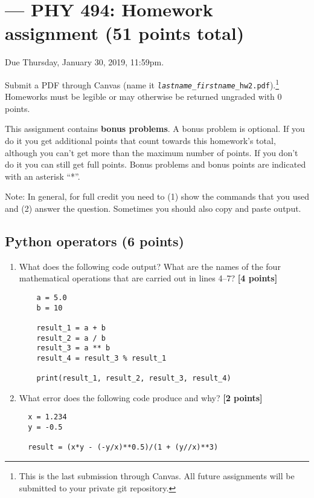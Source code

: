 \documentclass[letterpaper]{scrartcl}
\newcommand{\anumber}{2}
\newcounter{TotalPoints}
\newcommand{\points}[1]{\textbf{[#1 points]}\stepcounter{TotalPoints}}
\newenvironment{enuma}{\begin{enumerate}[label=(\alph*)]}{\end{enumerate}}
\begin{document}

\setcounter{section}{\anumber}
\addtocounter{section}{-1}
\section{ --- PHY 494: Homework assignment (51 points total)}

\noindent Due Thursday, January 30, 2019, 11:59pm.

\noindent Submit a PDF through Canvas (name it
\texttt{\emph{lastname}\_\emph{firstname}\_hw\anumber.pdf}).\footnote{This
is the last submission through Canvas. All future assignments will be
submitted to your private git repository.}
Homeworks must be legible or may otherwise be returned ungraded with 0
points.


This assignment contains \textbf{bonus problems}. A bonus problem is
optional. If you do it you get additional points that count towards
this homework's total, although you can't get more than the maximum
number of points. If you don't do it you can still get full
points. Bonus problems and bonus points are indicated with an asterisk
``*''.

Note: In general, for full credit you need to (1) show the commands
that you used and (2) answer the question. Sometimes you should also
copy and paste output.

\subsection{Python operators (6 points)}

\begin{enuma}
\item What does the following code output? What are the names of the four
  mathematical operations that are carried out in lines 4--7? \points{4}
  \begin{verbatim}
    a = 5.0
    b = 10
    
    result_1 = a + b
    result_2 = a / b
    result_3 = a ** b
    result_4 = result_3 % result_1
    
    print(result_1, result_2, result_3, result_4)
  \end{verbatim}
\item What error does the following code produce and why? \points{2}
  \begin{verbatim}
  x = 1.234
  y = -0.5

  result = (x*y - (-y/x)**0.5)/(1 + (y//x)**3)
  \end{verbatim}
\end{enuma}
\end{document}
